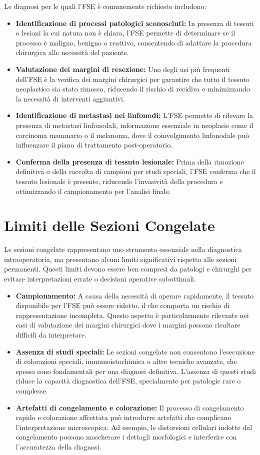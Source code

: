 Le diagnosi per le quali l'FSE è comunemente richiesto includono:
\begin{itemize}
    \item \textbf{Identificazione di processi patologici sconosciuti:} In presenza di tessuti o lesioni la cui natura non è chiara, l'FSE permette di determinare se il processo è maligno, benigno o reattivo, consentendo di adattare la procedura chirurgica alle necessità del paziente.
    \item \textbf{Valutazione dei margini di resezione:} Uno degli usi più frequenti dell'FSE è la verifica dei margini chirurgici per garantire che tutto il tessuto neoplastico sia stato rimosso, riducendo il rischio di recidiva e minimizzando la necessità di interventi aggiuntivi.
    \item \textbf{Identificazione di metastasi nei linfonodi:} L'FSE permette di rilevare la presenza di metastasi linfonodali, informazione essenziale in neoplasie come il carcinoma mammario o il melanoma, dove il coinvolgimento linfonodale può influenzare il piano di trattamento post-operatorio.
    \item \textbf{Conferma della presenza di tessuto lesionale:} Prima della rimozione definitiva o della raccolta di campioni per studi speciali, l'FSE conferma che il tessuto lesionale è presente, riducendo l'invasività della procedura e ottimizzando il campionamento per l'analisi finale.
\end{itemize}

\section{Limiti delle Sezioni Congelate}
Le sezioni congelate rappresentano uno strumento essenziale nella diagnostica intraoperatoria, ma presentano alcuni limiti significativi rispetto alle sezioni permanenti. Questi limiti devono essere ben compresi da patologi e chirurghi per evitare interpretazioni errate o decisioni operative subottimali.

\begin{itemize}
    \item \textbf{Campionamento:} A causa della necessità di operare rapidamente, il tessuto disponibile per l'FSE può essere ridotto, il che comporta un rischio di rappresentazione incompleta. Questo aspetto è particolarmente rilevante nei casi di valutazione dei margini chirurgici dove i margini possono risultare difficili da interpretare.
    \item \textbf{Assenza di studi speciali:} Le sezioni congelate non consentono l'esecuzione di colorazioni speciali, immunoistochimica o altre tecniche avanzate, che spesso sono fondamentali per una diagnosi definitiva. L'assenza di questi studi riduce la capacità diagnostica dell'FSE, specialmente per patologie rare o complesse.
    \item \textbf{Artefatti di congelamento e colorazione:} Il processo di congelamento rapido e colorazione affrettata può introdurre artefatti che complicano l'interpretazione microscopica. Ad esempio, le distorsioni cellulari indotte dal congelamento possono mascherare i dettagli morfologici e interferire con l’accuratezza della diagnosi.
\end{itemize}

